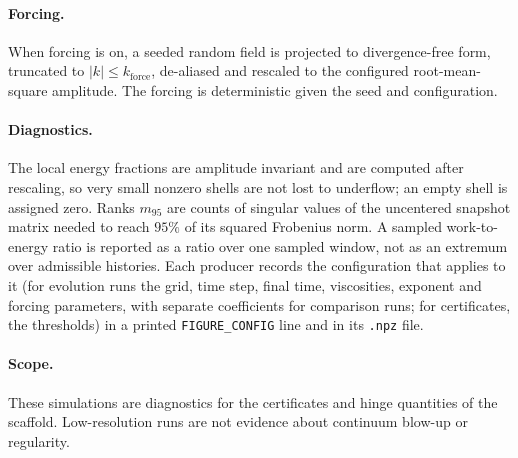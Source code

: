 \paragraph{Forcing.}
When forcing is on, a seeded random field is projected to divergence-free form, truncated to
$|k|\le k_{\mathrm{force}}$, de-aliased and rescaled to the configured root-mean-square amplitude. The
forcing is deterministic given the seed and configuration.

\paragraph{Diagnostics.}
The local energy fractions are amplitude invariant and are computed after rescaling, so very small
nonzero shells are not lost to underflow; an empty shell is assigned zero. Ranks $m_{95}$ are
counts of singular values of the uncentered snapshot matrix needed to reach $95\%$ of its squared
Frobenius norm. A sampled work-to-energy ratio is reported as a ratio over one sampled window, not
as an extremum over admissible histories. Each producer records the configuration that applies to it (for evolution
runs the grid, time step, final time, viscosities, exponent and forcing parameters, with separate
coefficients for comparison runs; for certificates, the thresholds) in a printed
\texttt{FIGURE\_CONFIG} line and in its \texttt{.npz} file.

\paragraph{Scope.}
These simulations are diagnostics for the certificates and hinge quantities of the scaffold.
Low-resolution runs are not evidence about continuum blow-up or regularity.
